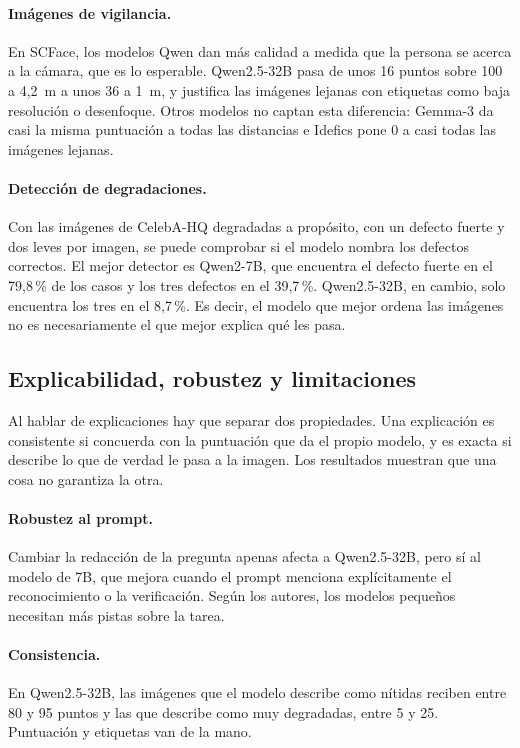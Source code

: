\paragraph{Imágenes de vigilancia.} En SCFace, los modelos Qwen dan más calidad a medida que la persona se acerca a la cámara, que es lo esperable. Qwen2.5-32B pasa de unos 16 puntos sobre 100 a 4,2~m a unos 36 a 1~m, y justifica las imágenes lejanas con etiquetas como baja resolución o desenfoque. Otros modelos no captan esta diferencia: Gemma-3 da casi la misma puntuación a todas las distancias e Idefics pone 0 a casi todas las imágenes lejanas.

\paragraph{Detección de degradaciones.} Con las imágenes de CelebA-HQ degradadas a propósito, con un defecto fuerte y dos leves por imagen, se puede comprobar si el modelo nombra los defectos correctos. El mejor detector es Qwen2-7B, que encuentra el defecto fuerte en el 79,8\,\% de los casos y los tres defectos en el 39,7\,\%. Qwen2.5-32B, en cambio, solo encuentra los tres en el 8,7\,\%. Es decir, el modelo que mejor ordena las imágenes no es necesariamente el que mejor explica qué les pasa.

\subsection{Explicabilidad, robustez y limitaciones}
\label{sec:explicabilidad}
Al hablar de explicaciones hay que separar dos propiedades. Una explicación es consistente si concuerda con la puntuación que da el propio modelo, y es exacta si describe lo que de verdad le pasa a la imagen. Los resultados muestran que una cosa no garantiza la otra.

\paragraph{Robustez al prompt.} Cambiar la redacción de la pregunta apenas afecta a Qwen2.5-32B, pero sí al modelo de 7B, que mejora cuando el prompt menciona explícitamente el reconocimiento o la verificación. Según los autores, los modelos pequeños necesitan más pistas sobre la tarea.

\paragraph{Consistencia.} En Qwen2.5-32B, las imágenes que el modelo describe como nítidas reciben entre 80 y 95 puntos y las que describe como muy degradadas, entre 5 y 25. Puntuación y etiquetas van de la mano.

